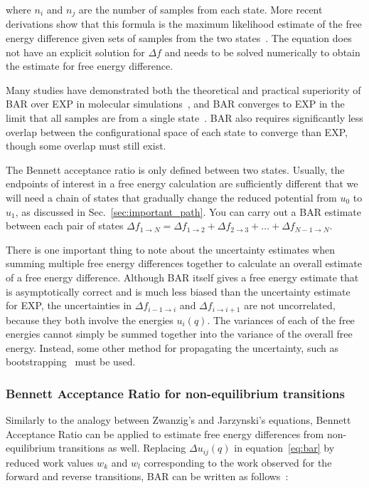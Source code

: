 where $n_i$ and $n_j$ are the number of samples from each state. More recent derivations show that this formula is the maximum likelihood estimate of the free energy difference given sets of samples from the two states~\cite{shirts2003equilibrium}. 
The equation does not have an explicit solution for $\Delta f$ and needs to be solved numerically to obtain the estimate for free energy difference.

Many studies have demonstrated both the theoretical and practical superiority of BAR over EXP in molecular
simulations~\cite{shirts2005comparison,lu2003appropriate}, and BAR converges to EXP in the limit that all samples are from a single state~\cite{bennett1976efficient,bennett1976efficient,shirts2003equilibrium}. BAR also requires significantly less overlap between the configurational space of each state to converge than EXP, though some overlap must still exist.

The Bennett acceptance ratio is only defined between two states. Usually, the endpoints of interest in a free energy calculation are sufficiently different that we will need a chain of states that gradually change the reduced potential from $u_0$ to $u_1$, as discussed in Sec.~\ref{sec:important_path}. You can carry out a BAR estimate between each pair of states $\Delta f_{1 \rightarrow N} = \Delta {f_{1\rightarrow 2}} + \Delta {f_{2\rightarrow 3}} +  \ldots + \Delta f_{N-1\rightarrow N}$.

There is one important thing to note about the uncertainty estimates when summing multiple free energy differences together to calculate an overall estimate of a free energy difference. Although BAR itself gives a free energy estimate that is asymptotically correct and is much less biased than the uncertainty estimate for EXP, the uncertainties in $\Delta {f_{i-1\rightarrow i}}$ and $\Delta {f_{i\rightarrow i+1}}$ are not uncorrelated, because they both involve the energies $u_i(q)$. The variances of each of the free energies cannot simply be summed together into the variance of the overall free energy. Instead, some other method for propagating the uncertainty, such as bootstrapping~\cite{grossfield2018best} must be used.

\subsubsection{Bennett Acceptance Ratio for non-equilibrium transitions}
Similarly to the analogy between Zwanzig's and Jarzynski's equations, Bennett Acceptance Ratio can be applied to estimate free energy differences from non-equilibrium transitions as well.
Replacing $\Delta u_{ij}(q)$ in equation~\ref{eq:bar} by reduced work values $w_k$ and $w_l$ corresponding to the work observed for the forward and reverse transitions, BAR can be written as follows~\cite{shirts2003equilibrium}:

